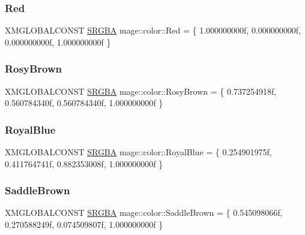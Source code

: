 \hypertarget{namespacemage_1_1color_a8832bac671d8a6ebbce6edc3c0289ada}{}\label{namespacemage_1_1color_a8832bac671d8a6ebbce6edc3c0289ada} 
\subsubsection{\texorpdfstring{Red}{Red}}
{\footnotesize\ttfamily X\+M\+G\+L\+O\+B\+A\+L\+C\+O\+N\+ST \hyperlink{structmage_1_1_s_r_g_b_a}{S\+R\+G\+BA} mage\+::color\+::\+Red = \{ 1.\+000000000f, 0.\+000000000f, 0.\+000000000f, 1.\+000000000f \}}

\hypertarget{namespacemage_1_1color_a4d29d760cc914eb93aef64c4d7bdc530}{}\label{namespacemage_1_1color_a4d29d760cc914eb93aef64c4d7bdc530} 
\subsubsection{\texorpdfstring{Rosy\+Brown}{RosyBrown}}
{\footnotesize\ttfamily X\+M\+G\+L\+O\+B\+A\+L\+C\+O\+N\+ST \hyperlink{structmage_1_1_s_r_g_b_a}{S\+R\+G\+BA} mage\+::color\+::\+Rosy\+Brown = \{ 0.\+737254918f, 0.\+560784340f, 0.\+560784340f, 1.\+000000000f \}}

\hypertarget{namespacemage_1_1color_a89c20a091fb4e7ae8ab9a4e57eec461c}{}\label{namespacemage_1_1color_a89c20a091fb4e7ae8ab9a4e57eec461c} 
\subsubsection{\texorpdfstring{Royal\+Blue}{RoyalBlue}}
{\footnotesize\ttfamily X\+M\+G\+L\+O\+B\+A\+L\+C\+O\+N\+ST \hyperlink{structmage_1_1_s_r_g_b_a}{S\+R\+G\+BA} mage\+::color\+::\+Royal\+Blue = \{ 0.\+254901975f, 0.\+411764741f, 0.\+882353008f, 1.\+000000000f \}}

\hypertarget{namespacemage_1_1color_a20a5cad46b0eda1bc5e1cdfe3df36498}{}\label{namespacemage_1_1color_a20a5cad46b0eda1bc5e1cdfe3df36498} 
\subsubsection{\texorpdfstring{Saddle\+Brown}{SaddleBrown}}
{\footnotesize\ttfamily X\+M\+G\+L\+O\+B\+A\+L\+C\+O\+N\+ST \hyperlink{structmage_1_1_s_r_g_b_a}{S\+R\+G\+BA} mage\+::color\+::\+Saddle\+Brown = \{ 0.\+545098066f, 0.\+270588249f, 0.\+074509807f, 1.\+000000000f \}}

